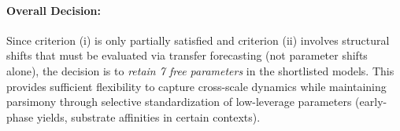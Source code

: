 \paragraph{Overall Decision:}
Since criterion (i) is only partially satisfied and criterion (ii) involves structural shifts 
that must be evaluated via transfer forecasting (not parameter shifts alone), the decision is 
to \emph{retain 7 free parameters} in the shortlisted models. This provides sufficient flexibility 
to capture cross-scale dynamics while maintaining parsimony through selective standardization of 
low-leverage parameters (early-phase yields, substrate affinities in certain contexts).

